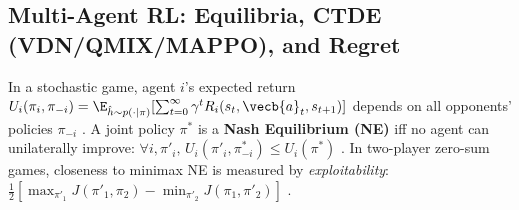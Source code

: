 \documentclass[../../../../master.tex]{subfiles}
\begin{document}
\subsection{Multi-Agent RL: Equilibria, CTDE (VDN/QMIX/MAPPO), and Regret}
\label{sec:mbrl:marl}

In a stochastic game, agent $i$'s expected return $U_i(\pi_i, \pi_{-i}) = \E_{\hat{h} \sim p(\cdot \mid \pi)}[\sum_{t=0}^\infty \gamma^t R_i(s_t, \vecb{a}_t, s_{t+1})]$ depends on all opponents' policies $\pi_{-i}$ . A joint policy $\pi^*$ is a \textbf{Nash Equilibrium (NE)} iff no agent can unilaterally improve: $\forall i, \pi'_i,\, U_i(\pi'_i, \pi^*_{-i}) \le U_i(\pi^*)$ . In two-player zero-sum games, closeness to minimax NE is measured by \emph{exploitability}: $\frac{1}{2}[\max_{\pi'_1} J(\pi'_1, \pi_2) - \min_{\pi'_2} J(\pi_1, \pi'_2)]$ .
\end{document}
